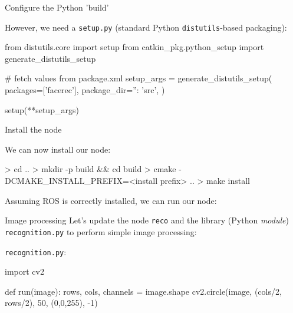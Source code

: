\documentclass[compress]{beamer}
\begin{document}
\begin{frame}[fragile]{Configure the Python 'build'}

However, we need a \texttt{setup.py} (standard Python
    \texttt{distutils}-based packaging):

\begin{pythoncode}
from distutils.core import setup
from catkin_pkg.python_setup import generate_distutils_setup

# fetch values from package.xml
setup_args = generate_distutils_setup(
                    packages=['facerec'],
                    package_dir={'': 'src'},
                )

setup(**setup_args)
\end{pythoncode}

\end{frame}

\begin{frame}[fragile]{Install the node}

    We can now install our node:

\begin{shcode}
> cd ..
> mkdir -p build && cd build
> cmake -DCMAKE_INSTALL_PREFIX=<install prefix> ..
> make install
\end{shcode}

\pause

Assuming ROS is correctly installed, we can run our node:



\end{frame}

\begin{frame}[fragile]{Image processing}
Let's update the node \texttt{reco} and the library (Python \emph{module})
    \texttt{recognition.py} to perform simple image processing:

\texttt{recognition.py}:
\begin{pythoncode}
import cv2

def run(image):
    rows, cols, channels = image.shape
    cv2.circle(image, (cols/2, rows/2), 50, (0,0,255), -1)
\end{pythoncode}
\end{frame}
\end{document}
